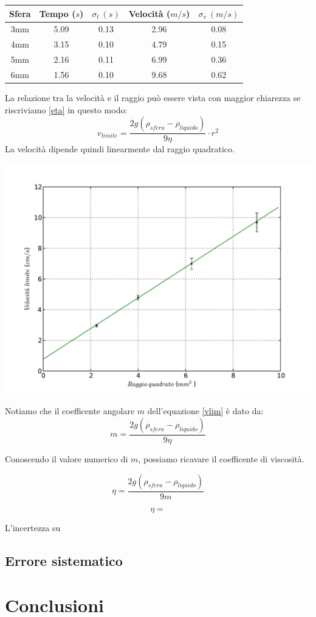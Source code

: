 \begin{center}
\begin{tabular}{c|c|c|c|c}
Sfera & Tempo ($s$) & $\sigma_t\ (s) $ & Velocità ($m/s$) & $\sigma_v \ (m/s) $\\
\midrule
3mm & 5.09 & 0.13 & 2.96 & 0.08\\
4mm & 3.15 & 0.10 & 4.79 & 0.15\\
5mm & 2.16 & 0.11 & 6.99 & 0.36\\
6mm & 1.56 & 0.10 & 9.68 & 0.62\\
\end{tabular}
\end{center}
La relazione tra la velocità e il raggio può essere vista con maggior chiarezza se riscriviamo \ref{eta}  in questo modo: 
\begin{equation}\label{vlim}
v_{limite}=  \frac{2g(\rho_{sfera} - \rho_{liquido})}{9 \eta} \cdot r^2
\end{equation}
La velocità dipende quindi linearmente dal raggio quadratico.

\begin{center}
\includegraphics[scale=0.75]{../grafici/velocita}
\end{center}

Notiamo che il coefficente angolare $m$ dell'equazione \ref{vlim} è dato da:
\begin{equation}
m= \frac{2g(\rho_{sfera} - \rho_{liquido})}{9 \eta}
\end{equation}

Conoscendo il valore numerico di $m$, possiamo ricavare il coefficente di viscosità.

\begin{equation}
\eta = \frac{2g(\rho_{sfera} - \rho_{liquido})}{9 m}
\end{equation}

$$\eta = $$

L'incertezza su 


\subsection*{Errore sistematico}
\section{Conclusioni}
